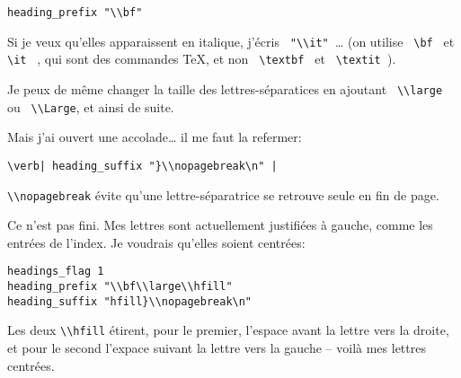 \begin{verbatim}
heading_prefix "\\bf"
\end{verbatim} 

Si je veux qu'elles apparaissent en italique, j'écris \verb| "\\it" |… (on utilise \verb+ \bf + et \verb+ \it + , qui sont des commandes \TeX, et non \verb+ \textbf + et \verb+ \textit +).

Je peux de même changer la taille des lettres-séparatices en ajoutant \verb| \\large | ou \verb| \\Large|, et ainsi de suite. 

Mais j'ai ouvert une accolade… il me faut la refermer:

\begin{verbatim}
\verb| heading_suffix "}\\nopagebreak\n" | 
\end{verbatim}

\verb|\\nopagebreak| évite qu'une lettre-séparatrice se retrouve seule en fin de page. 


Ce n'est pas fini. Mes lettres sont actuellement justifiées à gauche, comme les entrées de l'index. Je voudrais qu'elles soient centrées: 

\begin{verbatim}
headings_flag 1
heading_prefix "\\bf\\large\\hfill" 
heading_suffix "hfill}\\nopagebreak\n" 
\end{verbatim}

Les deux \verb|\\hfill| étirent, pour le premier, l'espace avant la lettre vers la droite, et pour le second l'expace suivant la lettre vers la gauche -- voilà mes lettres centrées.

